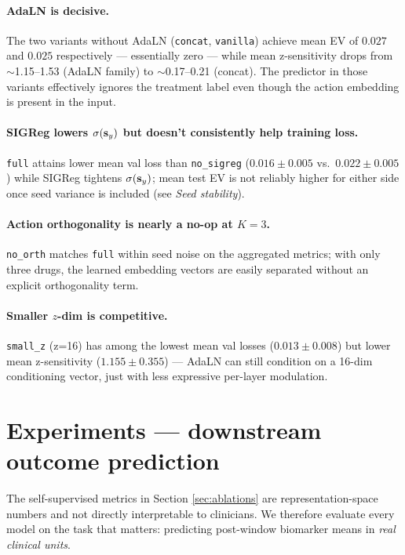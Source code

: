 \paragraph{AdaLN is decisive.} The two variants without AdaLN
(\texttt{concat}, \texttt{vanilla}) achieve mean EV of $0.027$ and
$0.025$ respectively --- essentially zero --- while mean z-sensitivity
drops from $\sim$1.15--1.53 (AdaLN family) to $\sim$0.17--0.21 (concat).
The predictor in those variants effectively ignores the treatment label
even though the action embedding is present in the input.

\paragraph{SIGReg lowers $\sigma(\mathbf{s}_y)$ but doesn't consistently help
training loss.} \texttt{full} attains lower mean val loss than
\texttt{no\_sigreg} ($0.016 \pm 0.005$ vs.\ $0.022 \pm 0.005$) while
SIGReg tightens $\sigma(\mathbf{s}_y)$; mean test EV is not reliably higher for
either side once seed variance is included (see \emph{Seed stability}).

\paragraph{Action orthogonality is nearly a no-op at $K{=}3$.}
\texttt{no\_orth} matches \texttt{full} within seed noise on the
aggregated metrics; with only three drugs, the learned embedding vectors
are easily separated without an explicit orthogonality term.

\paragraph{Smaller $z$-dim is competitive.} \texttt{small\_z} (z=16) has
among the lowest mean val losses ($0.013 \pm 0.008$) but lower mean
z-sensitivity ($1.155 \pm 0.355$) --- AdaLN can still condition on a
16-dim conditioning vector, just with less expressive per-layer
modulation.

\section{Experiments --- downstream outcome prediction}
\label{sec:downstream}

The self-supervised metrics in Section \ref{sec:ablations} are
representation-space numbers and not directly interpretable to
clinicians. We therefore evaluate every model on the task that matters:
predicting post-window biomarker means in \emph{real clinical units}.

